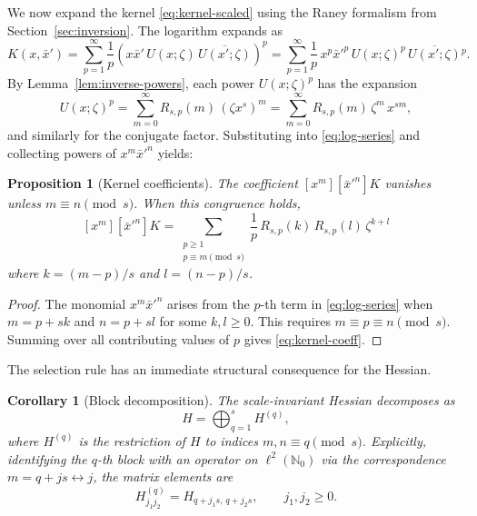 \documentclass[11pt]{amsart}
\numberwithin{equation}{section}
\theoremstyle{plain}
\newtheorem{proposition}[theorem]{Proposition}
\newtheorem{corollary}[theorem]{Corollary}
\theoremstyle{definition}
\theoremstyle{remark}
\begin{document}
We now expand the kernel \eqref{eq:kernel-scaled} using the Raney formalism
from Section~\ref{sec:inversion}. The logarithm expands as
\begin{equation}\label{eq:log-series}
	{K}(x, \bar{x}')
	= \sum_{p=1}^{\infty} \frac{1}{p} \left( x\bar{x}' \, U(x;\zeta) \, \overline{U(x';\zeta)} \right)^p
	= \sum_{p=1}^{\infty} \frac{1}{p} \, x^p \bar{x}'^p \, U(x;\zeta)^p \, \overline{U(x';\zeta)}{}^p.
\end{equation}
By Lemma~\ref{lem:inverse-powers}, each power $U(x;\zeta)^p$ has the expansion
\[
	U(x;\zeta)^p = \sum_{m=0}^{\infty} R_{s,p}(m) \, (\zeta x^s)^m
	= \sum_{m=0}^{\infty} R_{s,p}(m) \, \zeta^m \, x^{sm},
\]
and similarly for the conjugate factor. Substituting into \eqref{eq:log-series}
and collecting powers of $x^{m} \bar{x}'^{n}$ yields:

\begin{proposition}[Kernel coefficients]
	\label{prop:kernel-coeff}
	The coefficient $[x^{m}][\bar{x}'^{n}] {K}$ vanishes unless
	$m\equiv n \pmod{s}$. When this congruence holds,
	\begin{equation}\label{eq:kernel-coeff}
		[x^{m}][\bar{x}'^{n}] {K}
		= \sum_{\substack{p \ge 1 \\ p \equiv m \pmod{s}}}
		\frac{1}{p} \, R_{s,p}(k) \, R_{s,p}(l) \, \zeta^{k+l}
	\end{equation}
	where $k = (m - p)/s$ and $l = (n - p)/s$.
\end{proposition}

\begin{proof}
	The monomial $x^{m} \bar{x}'^{n}$ arises from the $p$-th term in
	\eqref{eq:log-series} when $m = p + sk$ and $n = p + sl$ for some
	$k, l \ge 0$. This requires $m \equiv p \equiv n \pmod{s}$.
	Summing over all contributing values of $p$ gives \eqref{eq:kernel-coeff}.
\end{proof}

The selection rule has an immediate structural consequence for the Hessian.

\begin{corollary}[Block decomposition]
	\label{cor:block-decomp}
	The scale-invariant Hessian decomposes as
	\begin{equation}\label{eq:block-decomp}
		H = \bigoplus_{q=1}^{s} H^{(q)},
	\end{equation}
	where $H^{(q)}$ is the restriction of $H$ to indices $m, n \equiv q \pmod{s}$.
	Explicitly, identifying the $q$-th block with an operator on $\ell^2(\mathbb{N}_0)$
	via the correspondence $m = q + js \leftrightarrow j$, the matrix elements are
	\begin{equation}\label{eq:block-entry}
		H^{(q)}_{j_1 j_2} = H_{q + j_1 s, \, q + j_2 s}, \qquad j_1, j_2 \ge 0.
	\end{equation}
\end{corollary}
\end{document}
